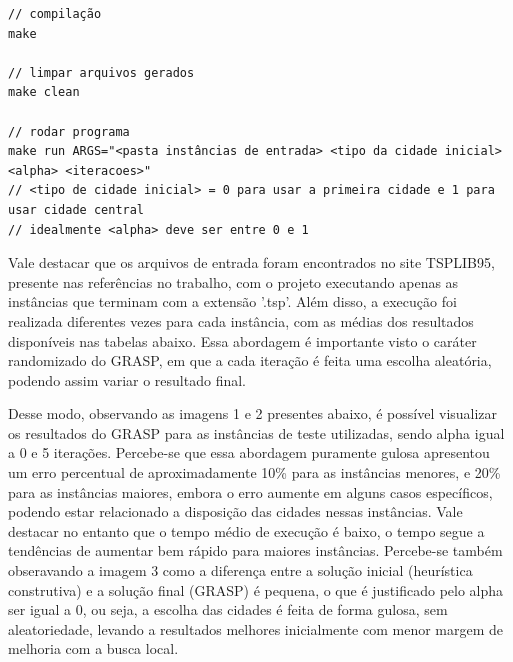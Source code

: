 \documentclass[10pt]{extarticle} %
\begin{document}
\begin{verbatim}
// compilação
make

// limpar arquivos gerados
make clean

// rodar programa
make run ARGS="<pasta instâncias de entrada> <tipo da cidade inicial> <alpha> <iteracoes>"
// <tipo de cidade inicial> = 0 para usar a primeira cidade e 1 para usar cidade central
// idealmente <alpha> deve ser entre 0 e 1
\end{verbatim}

Vale destacar que os arquivos de entrada foram encontrados no site TSPLIB95, presente nas referências no trabalho, com o projeto executando apenas as instâncias que terminam com a extensão '.tsp'. Além disso, a execução foi realizada diferentes vezes para cada instância, com as médias dos resultados disponíveis nas tabelas abaixo. Essa abordagem é importante visto o caráter randomizado do GRASP, em que a cada iteração é feita uma escolha aleatória, podendo assim variar o resultado final.  

Desse modo, observando as imagens 1 e 2 presentes abaixo, é possível visualizar os resultados do GRASP para as instâncias de teste utilizadas, sendo alpha igual a 0 e 5 iterações. Percebe-se que essa abordagem puramente gulosa apresentou um erro percentual de aproximadamente 10\% para as instâncias menores, e 20\% para as instâncias maiores, embora o erro aumente em alguns casos específicos, podendo estar relacionado a disposição das cidades nessas instâncias. Vale destacar no entanto que o tempo médio de execução é baixo, o tempo segue a tendências de aumentar bem rápido para maiores instâncias. Percebe-se também obseravando a imagem 3 como a diferença entre a solução inicial (heurística construtiva) e a solução final (GRASP) é pequena, o que é justificado pelo alpha ser igual a 0, ou seja, a escolha das cidades é feita de forma gulosa, sem aleatoriedade, levando a resultados melhores inicialmente com menor margem de melhoria com a busca local.
\end{document}
